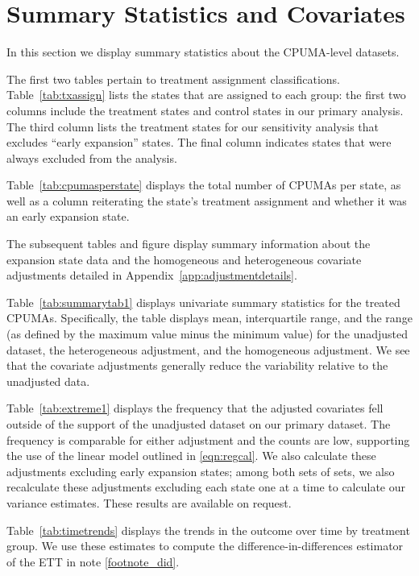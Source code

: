 \section{Summary Statistics and Covariates}\label{app:sumstats}

In this section we display summary statistics about the CPUMA-level datasets. 

The first two tables pertain to treatment assignment classifications. Table~\ref{tab:txassign} lists the states that are assigned to each group: the first two columns include the treatment states and control states in our primary analysis. The third column lists the treatment states for our sensitivity analysis that excludes ``early expansion'' states. The final column indicates states that were always excluded from the analysis. 

Table~\ref{tab:cpumasperstate} displays the total number of CPUMAs per state, as well as a column reiterating the state's treatment assignment and whether it was an early expansion state.

The subsequent tables and figure display summary information about the expansion state data and the homogeneous and heterogeneous covariate adjustments detailed in Appendix~\ref{app:adjustmentdetails}. 

Table~\ref{tab:summarytab1} displays univariate summary statistics for the treated CPUMAs. Specifically, the table displays mean, interquartile range, and the range (as defined by the maximum value minus the minimum value) for the unadjusted dataset, the heterogeneous adjustment, and the homogeneous adjustment. We see that the covariate adjustments generally reduce the variability relative to the unadjusted data. 

Table~\ref{tab:extreme1} displays the frequency that the adjusted covariates fell outside of the support of the unadjusted dataset on our primary dataset. The frequency is comparable for either adjustment and the counts are low, supporting the use of the linear model outlined in \eqref{eqn:regcal}. We also calculate these adjustments excluding early expansion states; among both sets of sets, we also recalculate these adjustments excluding each state one at a time to calculate our variance estimates. These results are available on request. 

Table~\ref{tab:timetrends} displays the trends in the outcome over time by treatment group. We use these estimates to compute the difference-in-differences estimator of the ETT in note \ref{footnote_did}. 

